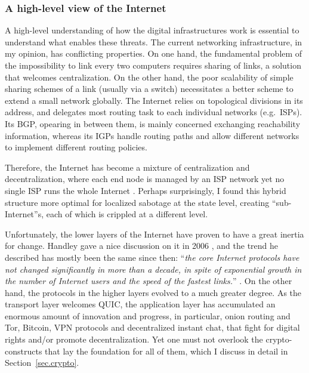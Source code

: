 \documentclass{article}
\begin{document}
\subsubsection{A high-level view of the Internet}
A high-level understanding of how the digital infrastructures work is essential
to understand what enables these threats. The current networking infrastructure,
in my opinion, has conflicting properties. On one hand, the fundamental problem
of the impossibility to link every two computers requires sharing of links, a
solution that welcomes centralization. On the other hand, the poor scalability
of simple sharing schemes of a link (usually via a switch) necessitates a
better scheme to extend a small network globally. The Internet relies on
topological divisions in its address, and delegates most routing task to each
individual networks (e.g.\ ISPs). Its BGP, opearing in between them, is mainly
concerned exchanging reachability information, whereas its IGPs handle
routing paths and allow different networks to implement different routing
policies.

Therefore, the Internet has become a mixture of centralization and
decentralization, where each end node is managed by an ISP network yet no
single ISP runs the whole Internet . Perhaps surprisingly, I found this hybrid
structure more optimal for localized sabotage at the state level, creating
``sub-Internet''s, each of which is crippled at a different level. 

Unfortunately, the lower layers of the Internet have proven to have a great
inertia for change.  Handley gave a nice discussion on it in 2006
\cite{why.internet.just.works}, and the trend he described has mostly been the
same since then: ``\emph{the core Internet protocols have not changed
significantly in more than a decade, in spite of exponential growth in the
number of Internet users and the speed of the fastest links.}''
\cite{why.internet.just.works}. On the other hand, the protocols in the higher
layers evolved to a much greater degree. As the transport layer welcomes
QUIC\cite{quic}, the application layer has accumulated an enormous amount of
innovation and progress, in particular, onion routing and
Tor\cite{onion.routing, tor}, Bitcoin\cite{bitcoin}, VPN
protocols\cite{openvpn, wireguard} and decentralized instant chat\cite{matrix,
tox}, that fight for digital rights and/or promote decentralization. Yet one
must not overlook the crypto-constructs that lay the foundation for all of
them, which I discuss in detail in Section~\ref{sec.crypto}.
\end{document}

